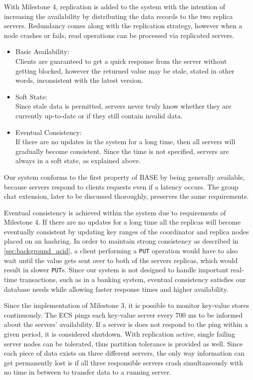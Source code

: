With Milestone 4, replication is added to the system with the intention of increasing the availability by distributing the data records to the two replica servers. Redundancy comes along with the replication strategy, however when a node crashes or fails, read operations can be processed via replicated servers.

\begin{itemize}
  \item Basic Availability:\\
 Clients are guaranteed to get a quick response from the server without getting blocked, however the returned value may be stale, stated in other words, inconsistent with the latest version.
  \item Soft State:\\
Since stale data is permitted, servers never truly know whether they are currently up-to-date or if they still contain invalid data.
  \item Eventual Consistency:\\
If there are no updates in the system for a long time, then all servers will gradually become consistent. Since the time is not specified, servers are always in a soft state, as explained above.
\end{itemize}

Our system conforms to the first property of BASE by being generally available, because servers respond to clients requests even if a latency occurs. The group chat extension, later to be discussed thoroughly, preserves the same requirements.

Eventual consistency is achieved within the system due to requirements of Milestone 4. If there are no updates for a long time all the replicas will become eventually consistent by updating key ranges of the coordinator and replica nodes placed on an hashring. In order to maintain strong consistency as described in \ref{sec:background_acid}, a client performing a \texttt{PUT} operation would have to also wait until the value gets sent over to both of the servers replicas, which would result in slower \texttt{PUT}s. Since our system is not designed to handle important real-time transactions, such as in a banking system, eventual consistency satisfies our database needs while allowing faster response times and higher availability. 

Since the implementation of Milestone 3, it is possible to monitor key-value stores continuously. The ECS pings each key-value server every 700 ms to be informed about the servers’ availability. If a server is does not respond to the ping within a given period, it is considered shutdown. With replication active, single failing server nodes can be tolerated, thus partition tolerance is provided as well. Since each piece of data exists on three different servers, the only way information can get permanently lost is if all three responsible servers crash simultaneously with no time in between to transfer data to a running server.

